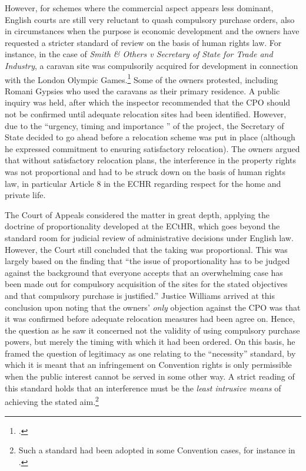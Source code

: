 However, for schemes where the commercial aspect appears less dominant, English courts are still very reluctant to quash compulsory purchase orders, also in circumstances when the purpose is economic development and the owners have requested a stricter standard of review on the basis of human rights law. For instance, in the case of {\it Smith \& Others v Secretary of State for Trade and Industry}, a caravan site was compulsorily acquired for development in connection with the London Olympic Games.\footcite{smith08} Some of the owners protested, including Romani Gypsies who used the caravans as their primary residence. A public inquiry was held, after which the inspector recommended that the CPO should not be confirmed until adequate relocation sites had been identified. However, due to the ``urgency, timing and importance '' of the project, the Secretary of State decided to go ahead before a relocation scheme was put in place (although he expressed commitment to ensuring satisfactory relocation). The owners argued that without satisfactory relocation plans, the interference in the property rights was not proportional and had to be struck down on the basis of human rights law, in particular Article 8 in the ECHR regarding respect for the home and private life.

The Court of Appeals considered the matter in great depth, applying the doctrine of proportionality developed at the ECtHR, which goes beyond the standard room for judicial review of administrative decisions under English law. However, the Court still concluded that the taking was proportional. This was largely based on the finding that ``the issue of proportionality has to be judged against the background that everyone accepts that an overwhelming case has been made out for compulsory acquisition of the sites for the stated objectives and that compulsory purchase is justified.'' Justice Williams arrived at this conclusion upon noting that the owners' {\it only} objection against the CPO was that it was confirmed before adequate relocation measures had been agree on. Hence, the question as he saw it concerned not the validity of using compulsory purchase powers, but merely the timing with which it had been ordered. On this basis, he framed the question of legitimacy as one relating to the ``necessity'' standard, by which it is meant that an infringement on Convention rights is only permissible when the public interest cannot be served in some other way. A strict reading of this standard holds that an interference must be the {\it least intrusive means} of achieving the stated aim.\footnote{Such a standard had been adopted in some Convention cases, for instance in \cite{samaroo01}.}

